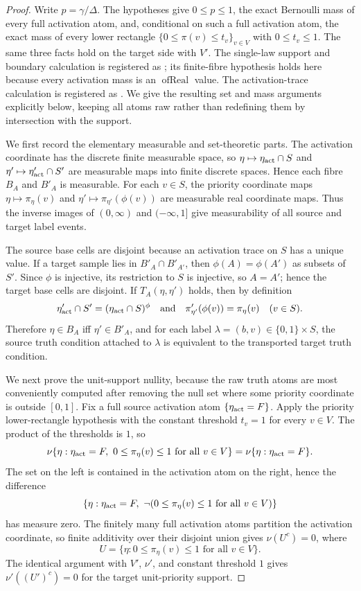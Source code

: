 \begin{proof}
Write \(p=\gamma/\Delta\).  The hypotheses give \(0\le p\le1\), the exact
Bernoulli mass of every full activation atom, and, conditional on such a full
activation atom, the exact mass of every lower rectangle
\(\{0\le\pi(v)\le t_v\}_{v\in V}\) with \(0\le t_v\le1\).  The same three
facts hold on the target side with \(V'\).
The single-law support and boundary calculation is registered as
; its finite-fibre hypothesis
holds here because every activation mass is an \(\operatorname{ofReal}\)
value. The activation-trace calculation is registered as
. We give the resulting
set and mass arguments explicitly below, keeping all atoms raw rather than
redefining them by intersection with the support.

We first record the elementary measurable and set-theoretic parts.  The
activation coordinate has the discrete finite measurable space, so
\(\eta\mapsto\eta_{\rm act}\cap S\) and
\(\eta'\mapsto\eta'_{\rm act}\cap S'\) are measurable maps into finite
discrete spaces.  Hence each fibre \(B_A\) and \(B'_A\) is measurable.  For
each \(v\in S\), the priority coordinate maps
\(\eta\mapsto \pi_\eta(v)\) and
\(\eta'\mapsto\pi_{\eta'}(\phi(v))\) are measurable real coordinate maps.
Thus the inverse images of \((0,\infty)\) and \((-\infty,1]\) give
measurability of all source and target label events.

The source base cells are disjoint because an activation trace on \(S\) has a
unique value.  If a target sample lies in \(B'_A\cap B'_{A'}\), then
\(\phi(A)=\phi(A')\) as subsets of \(S'\).  Since \(\phi\) is injective, its
restriction to \(S\) is injective, so \(A=A'\); hence the target base cells
are disjoint.  If \(T_A(\eta,\eta')\) holds, then by definition
\[
  \eta'_{\rm act}\cap S'=(\eta_{\rm act}\cap S)^\phi
  \quad\text{and}\quad
  \pi_{\eta'}'(\phi(v))=\pi_\eta(v)\quad(v\in S).
\]
Therefore \(\eta\in B_A\) iff \(\eta'\in B'_A\), and for each label
\(\lambda=(b,v)\in\{0,1\}\times S\), the source truth condition attached to
\(\lambda\) is equivalent to the transported target truth condition.

We next prove the unit-support nullity, because the raw truth atoms are most
conveniently computed after removing the null set where some priority
coordinate is outside \([0,1]\).  Fix a full source activation atom
\(\{\eta_{\rm act}=F\}\).  Apply the priority lower-rectangle hypothesis with
the constant threshold \(t_v=1\) for every \(v\in V\).  The product of the
thresholds is \(1\), so
\[
 \nu\{\eta:\eta_{\rm act}=F,\ 0\le\pi_\eta(v)\le1\text{ for all }v\in V\}
 =\nu\{\eta:\eta_{\rm act}=F\}.
\]
The set on the left is contained in the activation atom on the right, hence
the difference
\[
 \{\eta:\eta_{\rm act}=F,\ \neg(0\le\pi_\eta(v)\le1
       \text{ for all }v\in V)\}
\]
has measure zero.  The finitely many full activation atoms partition the
activation coordinate, so finite additivity over their disjoint union gives
\(\nu(U^c)=0\), where
\[
  U=\{\eta:0\le\pi_\eta(v)\le1\text{ for all }v\in V\}.
\]
The identical argument with \(V'\), \(\nu'\), and constant threshold \(1\)
gives \(\nu'((U')^c)=0\) for the target unit-priority support.


\end{proof}
